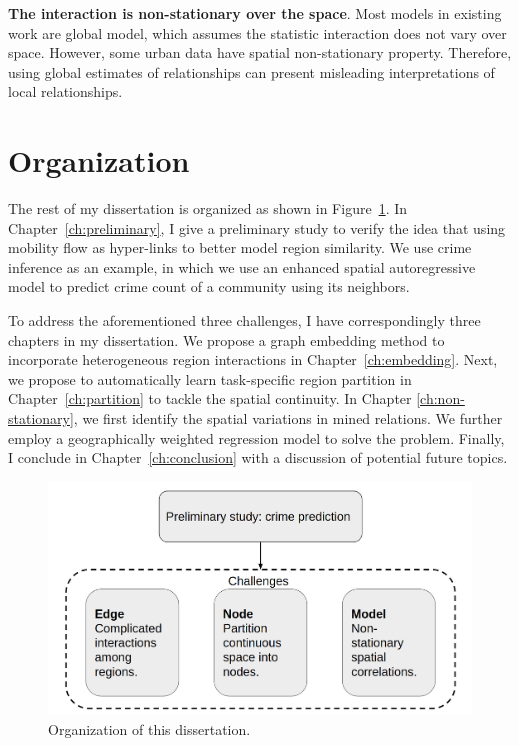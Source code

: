 \textbf{The interaction is non-stationary over the space}. Most models in existing work are global model, which assumes the statistic interaction does not vary over space. However, some urban data have spatial non-stationary property. Therefore, using global estimates of relationships can present misleading interpretations of local relationships.



\section{Organization}


The rest of my dissertation is organized as shown in Figure~\ref{fig:org}. In Chapter~\ref{ch:preliminary}, I give a preliminary study to verify the idea that using mobility flow as hyper-links to better model region similarity. We use crime inference as an example, in which we use an enhanced spatial autoregressive model to predict crime count of a community using its neighbors.

To address the aforementioned three challenges, I have correspondingly three chapters in my dissertation. We propose a graph embedding method to incorporate heterogeneous region interactions in Chapter~\ref{ch:embedding}. Next, we propose to automatically learn task-specific region partition in Chapter~\ref{ch:partition} to tackle the spatial continuity. In Chapter \ref{ch:non-stationary}, we first identify the spatial variations in mined relations. We further employ a geographically weighted regression model to solve the problem. Finally, I conclude in Chapter~\ref{ch:conclusion} with a discussion of potential future topics.


\begin{figure}[h]
\centering
\includegraphics[width=\linewidth]{fig/organization.png}
\caption{Organization of this dissertation.}
\label{fig:org}
\end{figure}


